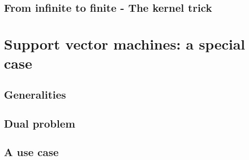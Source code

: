 \documentclass[a4paper, 11pt]{article}
\begin{document}
\subsection{From infinite to finite - The kernel trick}
\section{Support vector machines: a special case}
\subsection{Generalities}
\subsection{Dual problem}
\subsection{A use case}
\end{document}
